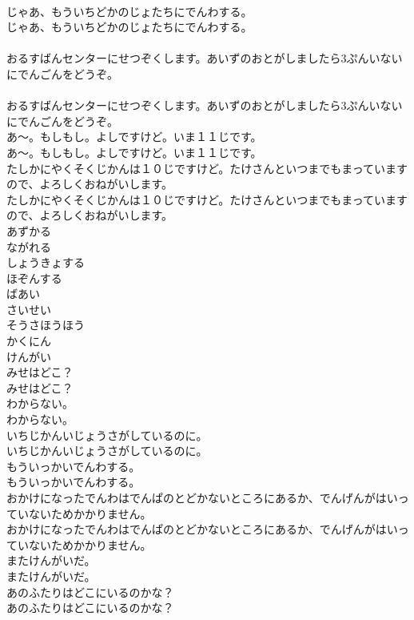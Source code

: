\documentclass[8pt]{extreport}
\begin{document}
\begin{CJK}{UTF8}{min}
\\	じゃあ、もういちどかのじょたちにでんわする。	
\\	じゃあ、もういちどかのじょたちにでんわする。 
\\	[けいたいるすでん] 
\\	おるすばんセンターにせつぞくします。あいずのおとがしましたら3ぷんいないにでんごんをどうぞ。	
\\	[けいたいるすでん] 
\\	おるすばんセンターにせつぞくします。あいずのおとがしましたら3ぷんいないにでんごんをどうぞ。 
\\	あ〜。もしもし。よしですけど。いま１１じです。	
\\	あ〜。もしもし。よしですけど。いま１１じです。 
\\	たしかにやくそくじかんは１０じですけど。たけさんといつまでもまっていますので、よろしくおねがいします。	
\\	たしかにやくそくじかんは１０じですけど。たけさんといつまでもまっていますので、よろしくおねがいします。 
\\	あずかる
\\	ながれる
\\	しょうきょする
\\	ほぞんする
\\	ばあい
\\	さいせい
\\	そうさほうほう
\\	かくにん
\\	けんがい
\\	みせはどこ？	
\\	みせはどこ？ 
\\	わからない。	
\\	わからない。 
\\	いちじかんいじょうさがしているのに。	
\\	いちじかんいじょうさがしているのに。 
\\	もういっかいでんわする。	
\\	もういっかいでんわする。 
\\	おかけになったでんわはでんぱのとどかないところにあるか、でんげんがはいっていないためかかりません。	
\\	おかけになったでんわはでんぱのとどかないところにあるか、でんげんがはいっていないためかかりません。 
\\	またけんがいだ。	
\\	またけんがいだ。 
\\	あのふたりはどこにいるのかな？	
\\	あのふたりはどこにいるのかな？ 

\end{CJK}
\end{document}
